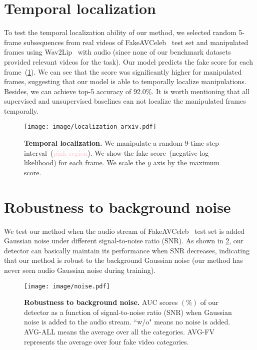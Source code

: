 \documentclass[10pt,twocolumn,letterpaper]{article}
\def\upvspacefig{\vspace{-0.0mm}}
\begin{document}
\section{Temporal localization}

To test the temporal localization ability of our method, we selected random 5-frame subsequences from real videos of FakeAVCeleb~\cite{NEURIPS_DATASETS_AND_BENCHMARKS2021_d9d4f495} test set and manipulated frames using Wav2Lip~\cite{prajwal2020lip} with audio (since none of our benchmark datasets provided relevant videos for the task). Our model predicts the fake score for each frame~(\cref{temporal_localization_arxiv}). We can see that the score was significantly higher for manipulated frames, suggesting that our model is able to temporally localize manipulations. Besides, we can achieve top-5 accuracy of 92.0\%. It is worth mentioning that all supervised and unsupervised baselines can not localize the manipulated frames temporally. 
\begin{figure}[h]
    \centering

    \texttt{[image: image/localization\_arxiv.pdf]}

        \caption{\textbf{Temporal localization.} We manipulate a random 9-time step interval~(\textcolor{pink}{pink region}). We show the fake score~(negative log-likelihood) for each frame. We scale the $y$ axis by the maximum score. } 

        
    \label{temporal_localization_arxiv}
\end{figure} 
\section{Robustness to background noise}

We test our method when the audio stream of FakeAVCeleb~\cite{NEURIPS_DATASETS_AND_BENCHMARKS2021_d9d4f495} test set is added Gaussian noise under different signal-to-noise ratio (SNR). As shown in \cref{noise}, our detector can basically maintain its performance when SNR decreases, indicating that our method is robust to the background Gaussian noise (our method has never seen audio Gaussian noise during training). 
\begin{figure}[h]
    \centering
    \upvspacefig
    \texttt{[image: image/noise.pdf]}
    \caption{\textbf{Robustness to background noise.} AUC scores $(\%)$ of our detector as a function of signal-to-noise ratio (SNR) when Gaussian noise is added to the audio stream. ``w/o" means no noise is added. AVG-ALL means the average over all the categories. AVG-FV represents the average over four fake video categories.} 
    \label{noise}
\end{figure}  
\end{document}
